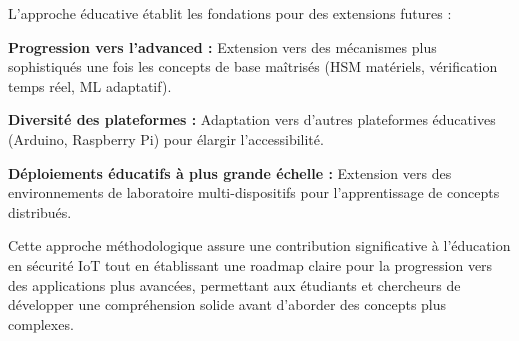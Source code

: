 L'approche éducative établit les fondations pour des extensions futures :

\textbf{Progression vers l'advanced :} Extension vers des mécanismes plus sophistiqués une fois les concepts de base maîtrisés (HSM matériels, vérification temps réel, ML adaptatif).

\textbf{Diversité des plateformes :} Adaptation vers d'autres plateformes éducatives (Arduino, Raspberry Pi) pour élargir l'accessibilité.

\textbf{Déploiements éducatifs à plus grande échelle :} Extension vers des environnements de laboratoire multi-dispositifs pour l'apprentissage de concepts distribués.

Cette approche méthodologique assure une contribution significative à l'éducation en sécurité IoT tout en établissant une roadmap claire pour la progression vers des applications plus avancées, permettant aux étudiants et chercheurs de développer une compréhension solide avant d'aborder des concepts plus complexes.
